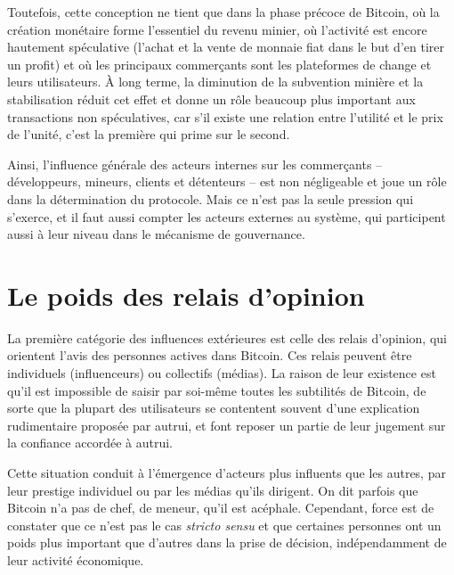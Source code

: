 Toutefois, cette conception ne tient que dans la phase précoce de Bitcoin, où la création monétaire forme l'essentiel du revenu minier, où l'activité est encore hautement spéculative (l'achat et la vente de monnaie fiat dans le but d'en tirer un profit) et où les principaux commerçants sont les plateformes de change et leurs utilisateurs. À long terme, la diminution de la subvention minière et la stabilisation réduit cet effet et donne un rôle beaucoup plus important aux transactions non spéculatives, car s'il existe une relation entre l'utilité et le prix de l'unité, c'est la première qui prime sur le second.

Ainsi, l'influence générale des acteurs internes sur les commerçants -- développeurs, mineurs, clients et détenteurs -- est non négligeable et joue un rôle dans la détermination du protocole. Mais ce n'est pas la seule pression qui s'exerce, et il faut aussi compter les acteurs externes au système, qui participent aussi à leur niveau dans le mécanisme de gouvernance.

\section*{Le poids des relais d'opinion} %

La première catégorie des influences extérieures est celle des relais d'opinion, qui orientent l'avis des personnes actives dans Bitcoin. Ces relais peuvent être individuels (influenceurs) ou collectifs (médias). La raison de leur existence est qu'il est impossible de saisir par soi-même toutes les subtilités de Bitcoin, de sorte que la plupart des utilisateurs se contentent souvent d'une explication rudimentaire proposée par autrui, et font reposer un partie de leur jugement sur la confiance accordée à autrui.

Cette situation conduit à l'émergence d'acteurs plus influents que les autres, par leur prestige individuel ou par les médias qu'ils dirigent. On dit parfois que Bitcoin n'a pas de chef, de meneur, qu'il est acéphale. Cependant, force est de constater que ce n'est pas le cas \emph{stricto sensu} et que certaines personnes ont un poids plus important que d'autres dans la prise de décision, indépendamment de leur activité économique.

